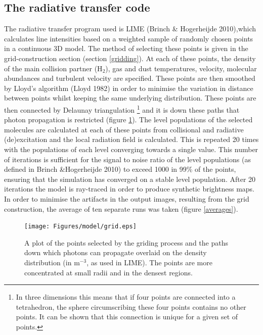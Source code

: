\documentclass[useAMS,usenatbib]{mn2e}
\begin{document}
\subsection{The radiative transfer code} \label{subsec:radiative_transfer_code}
The radiative transfer program used is LIME (Brinch \& Hogerheijde 2010),which  calculates line intensities based on a weighted sample of randomly chosen points in a continuous 3D model. The method of selecting these points is given in the grid-construction section (section \ref{gridding}). At each of these points, the density of the main collision partner (H$_2$), gas and dust temperatures, velocity, molecular abundances and turbulent velocity are specified. These points are then smoothed by Lloyd's algorithm (Lloyd 1982) in order to minimise the variation in distance between points whilst keeping the same underlying distribution. These points are then connected by Delaunay triangulation \footnote{In three dimensions this means that if four points are connected into a tetrahedron, the sphere circumscribing these four points contains no other points. It can be shown that this connection is unique for a given set of points.} and it is down these paths that photon propagation is restricted (figure \ref{grid}). The level populations of the selected molecules are calculated at each of these points from collisional and radiative (de)excitation and the local radiation field is calculated. This is repeated 20 times with the populations of each level converging towards a single value. This number of iterations is sufficient for the signal to noise ratio of the level populations (as defined in Brinch \&Hogerheijde 2010) to exceed 1000 in 99\% of the points, ensuring that the simulation has converged on a stable level population. After 20 iterations the model is ray-traced in order to produce synthetic brightness maps. In order to minimise the artifacts in the output images, resulting from the grid construction, the average of ten separate runs was taken (figure \ref{averages}).


\begin{figure}
 \texttt{[image: Figures/model/grid.eps]}%
 \caption{A plot of the points selected by the griding process and the paths down which photons can propagate overlaid on the density distribution (in m$^{-3}$, as used in LIME). The points are more concentrated at small radii and in the densest regions.}
 \label{grid}
\end{figure}
\end{document}
